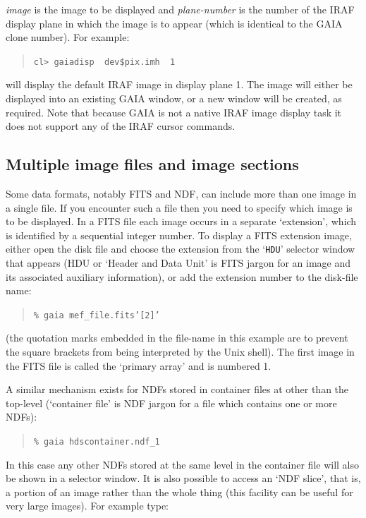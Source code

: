 \documentclass[twoside,11pt]{article}
\begin{document}
{\it image}\/ is the image to be displayed and {\it plane-number}\/ is
the number of the IRAF display plane in which the image is to appear
(which is identical to the GAIA clone number).  For example:

\begin{quote}
{\tt cl>  gaiadisp ~dev\$pix.imh ~1}
\end{quote}

will display the default IRAF image in display plane 1.  The image will
either be displayed into an existing GAIA window, or a new window will
be created, as required.  Note that because GAIA is not a native IRAF
image display task it does not support any of the IRAF cursor commands.

\subsection{\label{MULT}Multiple image files and image sections}

Some data formats, notably FITS and NDF, can include more than one
image in a single file.  If you encounter such a file then you need to
specify which image is to be displayed.  In a FITS file each image occurs
in a separate `extension', which is identified by a sequential integer
number.  To display a FITS extension image, either open the disk file and
choose the extension from the `{\tt HDU}' selector window that appears
(HDU or `Header and Data Unit' is FITS jargon for an image and its associated
auxiliary information), or add the extension number to the disk-file name:

\begin{quote}
{\tt \% gaia mef\_file.fits'[2]'}
\end{quote}

(the quotation marks embedded in the file-name in this example are to
prevent the square brackets from being interpreted by the Unix shell).
The first image in the FITS file is called the `primary array' and is
numbered 1.

A similar mechanism exists for NDFs stored in container files at other
than the top-level (`container file' is NDF jargon for a file which
contains one or more NDFs):

\begin{quote}
{\tt \% gaia hdscontainer.ndf\_1}
\end{quote}

In this case any other NDFs stored at the same level in the container
file will also be shown in a selector window.  It is also possible to
access an `NDF slice', that is, a portion of an image rather than the
whole thing (this facility can be useful for very large images).  For
example type:
\end{document}
